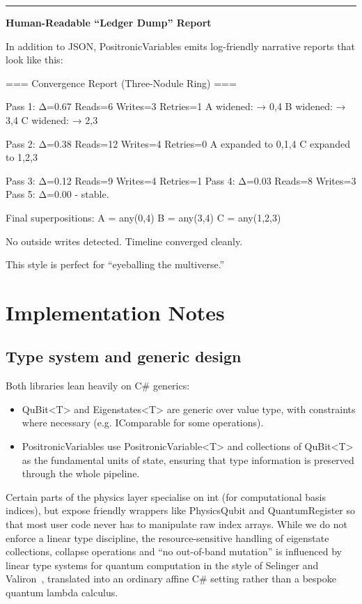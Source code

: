 \documentclass[a4paper,11pt]{article}
\begin{document}
\begin{center}\rule{0.5\linewidth}{0.5pt}\end{center}

\textbf{Human-Readable ``Ledger Dump'' Report}

In addition to JSON, PositronicVariables emits log-friendly narrative reports that look like this:

\begin{datadump}
=== Convergence Report (Three-Nodule Ring) ===

Pass 1: Δ=0.67 Reads=6 Writes=3 Retries=1
A widened: {} → {0,4}
B widened: {} → {3,4}
C widened: {} → {2,3}

Pass 2: Δ=0.38 Reads=12 Writes=4 Retries=0
A expanded to {0,1,4}
C expanded to {1,2,3}

Pass 3: Δ=0.12 Reads=9 Writes=4 Retries=1
Pass 4: Δ=0.03 Reads=8 Writes=3
Pass 5: Δ=0.00 - stable.

Final superpositions:
A = any(0,4)
B = any(3,4)
C = any(1,2,3)

No outside writes detected.
Timeline converged cleanly.
\end{datadump}

This style is perfect for ``eyeballing the multiverse.''

\section{Implementation Notes}

\subsection{Type system and generic design}

Both libraries lean heavily on C\# generics:

\begin{itemize}
\item
  QuBit\textless T\textgreater{} and Eigenstates\textless T\textgreater{} are generic over value type, with constraints where necessary (e.g. IComparable for some operations).
\item
  PositronicVariables use PositronicVariable\textless T\textgreater{} and collections of QuBit\textless T\textgreater{} as the fundamental units of state, ensuring that type information is preserved through the whole pipeline.
\end{itemize}

Certain parts of the physics layer specialise on int (for computational basis indices), but expose friendly wrappers like PhysicsQubit and QuantumRegister so that most user code never has to manipulate raw index arrays.
While we do not enforce a linear type discipline, the resource-sensitive handling of eigenstate collections, collapse operations and ``no out-of-band mutation'' is influenced by linear type systems for quantum computation in the style of Selinger and Valiron~\parencite{SelingerValiron10}, translated into an ordinary affine C\# setting rather than a bespoke quantum lambda calculus.
\end{document}
